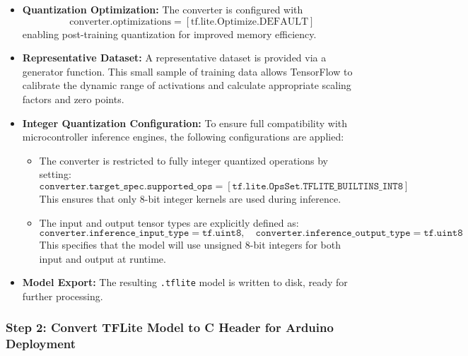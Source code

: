 \begin{itemize}

    \item \textbf{Quantization Optimization:}  The converter is configured with \begin{equation}
    \text{converter.optimizations} = [\text{tf.lite.Optimize.DEFAULT}]
    \end{equation}
    enabling post-training quantization for improved memory efficiency.\cite{tensorflow_quantization}
    
    
    \item \textbf{Representative Dataset:}  
    A representative dataset is provided via a generator function. This small sample of training data allows TensorFlow to calibrate the dynamic range of activations and calculate appropriate scaling factors and zero points.\cite{tensorflow_representativedataset}

    \item \textbf{Integer Quantization Configuration:}  
    To ensure full compatibility with microcontroller inference engines, the following configurations are applied:
    
    \begin{itemize}
        \item The converter is restricted to fully integer quantized operations by setting:
        \begin{equation}
            \texttt{converter.target\_spec.supported\_ops} = [\texttt{tf.lite.OpsSet.TFLITE\_BUILTINS\_INT8}]
        \end{equation}
        This ensures that only 8-bit integer kernels are used during inference.
    
        \item The input and output tensor types are explicitly defined as:
        \[
            \texttt{converter.inference\_input\_type} = \texttt{tf.uint8}, \quad
            \texttt{converter.inference\_output\_type} = \texttt{tf.uint8}
        \]
        This specifies that the model will use unsigned 8-bit integers for both input and output at runtime.
    \end{itemize}

    \item \textbf{Model Export:}  
    The resulting \texttt{.tflite} model is written to disk, ready for further processing.
\end{itemize}

\subsubsection*{Step 2: Convert TFLite Model to C Header for Arduino Deployment}

